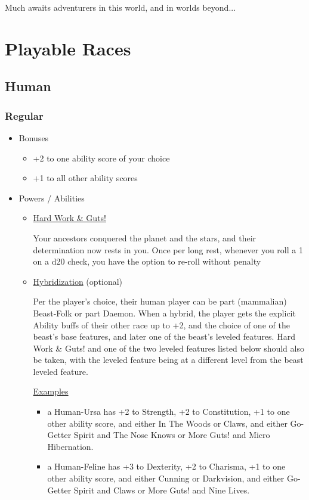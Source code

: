 \documentclass[12pt, twoside]{article}
\begin{document}
\begin{FlushLeft}
\begin{multicols}{2}
			Much awaits adventurers in this world, and in worlds beyond...
			\vfill
			\pagebreak

			\section{Playable Races}
			\subsection{Human}
			\subsubsection{Regular}
			\begin{itemize}[wide]
				\item Bonuses
				\begin{itemize}
					\item +2 to one ability score of your choice
					\item +1 to all other ability scores
				\end{itemize}
				\item Powers  / Abilities
				\begin{itemize}
					\item \underline{Hard Work \& Guts!}

					Your ancestors conquered the planet and the stars, and their determination now rests in you. Once per long rest, whenever you roll a 1 on a d20 check, you have the option to re-roll without penalty

					\item \underline{Hybridization} (optional)

					Per the player’s choice, their human player can be part (mammalian) Beast-Folk or part Daemon.
					When a hybrid, the player gets the explicit Ability buffs of their other race up to +2, and the choice of one of the beast’s base features, and later one of the beast’s leveled features.
					Hard Work \& Guts! and one of the two leveled features listed below should also be taken, with the leveled feature being at a different level from the beast leveled feature.

					\underline{Examples}
					\begin{itemize}
						\item a Human-Ursa has +2 to Strength, +2 to Constitution, +1 to one other ability score, and either In The Woods or Claws, and either Go-Getter Spirit and The Nose Knows or More Guts! and Micro Hibernation.
						\item a Human-Feline has +3 to Dexterity, +2 to Charisma, +1 to one other ability score, and either Cunning or Darkvision, and either Go-Getter Spirit and Claws or More Guts! and Nine Lives.
					\end{itemize}


\end{itemize}
\end{itemize}
\end{multicols}
\end{FlushLeft}
\end{document}
